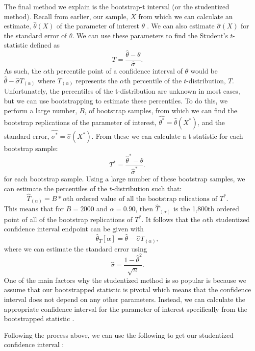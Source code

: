 \documentclass[12pt]{article}
\begin{document}
The final method we explain is the bootstrap-t interval (or the
studentized method). Recall from earlier, our sample, \(X\) from which
we can calculate an estimate, \(\hat{\theta}(X)\) of the parameter of
interest \(\theta\) \citep[\citet{Puth15}]{Efron86}. We can also
estimate \(\hat{\sigma}(X)\) for the standard error of \(\theta\). We
can use these parameters to find the Student's \(t\)-statistic defined
as \[T = \frac{\hat{\theta} - \theta}{\hat{\sigma}}.\] As such, the
\(\alpha\)th percentile point of a confidence interval of \(\theta\)
would be \(\hat{\theta} - \hat{\sigma}T_{(\alpha)}\) where
\(T_{(\alpha)}\) represents the \(\alpha\)th percentile of the
\(t\)-distribution, \(T\). Unfortunately, the percentiles of the
t-distribution are unknown in most cases, but we can use bootstrapping
to estimate these percentiles. To do this, we perform a large number,
\(B\), of bootstrap samples, from which we can find the bootstrap
replications of the parameter of interest,
\(\hat{\theta^*} = \hat{\theta}(X^*)\), and the standard error,
\(\hat{\sigma^*} = \hat{\sigma}(X^*)\). From these we can calculate a
t-statistic for each bootstrap sample:
\[T^* = \frac{\hat{\theta}^* - \hat{\theta}}{\hat{\sigma}^*}.\] for each
bootstrap sample. Using a large number of these bootstrap samples, we
can estimate the percentiles of the \(t\)-distribution such that:
\[\hat{T}_{(\alpha)} = B*\alpha\text{th ordered value of all the bootstrap relications of }T^*.\]
This means that for \(B = 2000\) and \(\alpha = 0.90\), then
\(\hat{T}_{(\alpha)}\) is the 1,800th ordered point of all of the
bootstrap replications of \(T^*\). It follows that the \(\alpha\)th
studentized confidence interval endpoint can be given with
\[\hat{\theta}_T[\alpha] = \hat{\theta} - \hat{\sigma}T_{(\alpha)},\]
where we can estimate the standard error using
\[\hat{\sigma} = \frac{1-\hat{\theta}^2}{\sqrt{n}}.\] One of the main
factors why the studentized method is so popular is because we assume
that our bootstrapped statistic is pivotal which means that the
confidence interval does not depend on any other parameters. Instead, we
can calculate the appropriate confidence interval for the parameter of
interest specifically from the bootstrapped statistic
\citep[\citet{Puth15}]{Efron86}.

Following the process above, we can use the following to get our
studentized confidence interval \citep{Lau20}:
\end{document}
